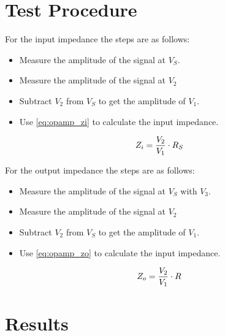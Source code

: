 \section{Test Procedure}

For the input impedance the steps are as follows:
\begin{itemize}
\item Measure the amplitude of the signal at $V_S$.
\item Measure the amplitude of the signal at $V_2$ 
\item Subtract $V_2$ from $V_S$ to get the amplitude of $V_1$. 
\item Use \autoref{eq:opamp_zi} to calculate the input impedance.
\end{itemize}

\begin{equation}\label{eq:opamp_zi}
        Z_i = \frac{V_2}{V_1} \cdot R_S
        \addunit{\si{\ohm}}
    \end{equation}

    \startexplain
    \stopexplain
    
For the output impedance the steps are as follows:
\begin{itemize}
\item Measure the amplitude of the signal at $V_S$ with $V_3$.
\item Measure the amplitude of the signal at $V_2$ 
\item Subtract $V_2$ from $V_S$ to get the amplitude of $V_1$. 
\item Use \autoref{eq:opamp_zo} to calculate the input impedance.
\end{itemize}

\begin{equation}\label{eq:opamp_zo}
        Z_o = \frac{V_2}{V_1} \cdot R
        \addunit{\si{\ohm}}
    \end{equation}

    \startexplain
    \stopexplain

\section{Results}


